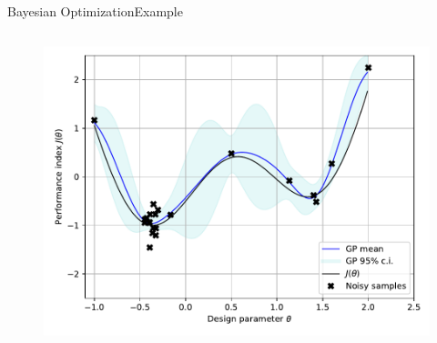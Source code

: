 \documentclass{beamer}
\begin{document}
\begin{frame}{Bayesian Optimization}{Example}
\begin{columns}
{\begin{figure}
    \includegraphics[width=\textwidth]{img/BO/BO_fit_19.pdf}
\end{figure}
}


\end{columns}
\end{frame}
\end{document}
